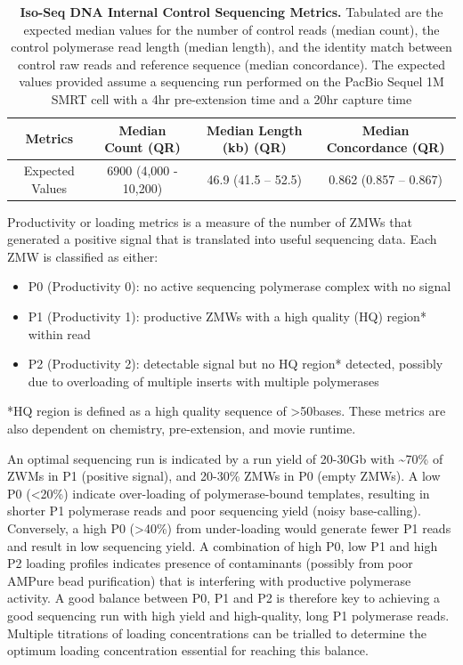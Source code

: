 \vspace{1cm}
\begin{table}[!h]
	\caption[Iso-Seq DNA Internal Control Sequencing Metrics]%
	{\textbf{Iso-Seq DNA Internal Control Sequencing Metrics.} Tabulated are the expected median values for the number of control reads (median count), the control polymerase read length (median length), and the identity match between control raw reads and reference sequence (median concordance). The expected values provided assume a sequencing run performed on the PacBio Sequel 1M SMRT cell with a 4hr pre-extension time and a 20hr capture time}
	\label{tab:control_Isoseqmetrics}
	
	\centering
	\begin{tabular}{@{}cccc@{}}
		\toprule
		Metrics         & Median Count (QR)     & Median Length (kb) (QR) & Median Concordance (QR) \\ \midrule
		Expected Values & 6900 (4,000 - 10,200) & 46.9 (41.5 – 52.5) & 0.862 (0.857 – 0.867)   \\ \bottomrule
	\end{tabular}
\end{table}


Productivity or loading metrics is a measure of the number of ZMWs that generated a positive signal that is translated into useful sequencing data. Each ZMW is classified as either: 
\begin{itemize}
	\item P0 (Productivity 0): no active sequencing polymerase complex with no signal 
	\item P1 (Productivity 1): productive ZMWs with a high quality (HQ) region* within read 
	\item P2 (Productivity 2): detectable signal but no HQ region* detected, possibly due to overloading of multiple inserts with multiple polymerases
\end{itemize}
*HQ region is defined as a high quality sequence of >50bases. These metrics are also dependent on chemistry, pre-extension, and movie runtime.  

An optimal sequencing run is indicated by a run yield of 20-30Gb with \textasciitilde70\% of ZWMs in P1 (positive signal), and 20-30\% ZMWs in P0 (empty ZMWs). A low P0 (<20\%) indicate over-loading of polymerase-bound templates, resulting in shorter P1 polymerase reads and poor sequencing yield (noisy base-calling). Conversely, a high P0 (>40\%) from under-loading would generate fewer P1 reads and result in low sequencing yield. A combination of high P0, low P1 and high P2 loading profiles indicates presence of contaminants (possibly from poor AMPure bead purification) that is interfering with productive polymerase activity. A good balance between P0, P1 and P2 is therefore key to achieving a good sequencing run with high yield and high-quality, long P1 polymerase reads. Multiple titrations of loading concentrations can be trialled to determine the optimum loading concentration essential for reaching this balance. 

